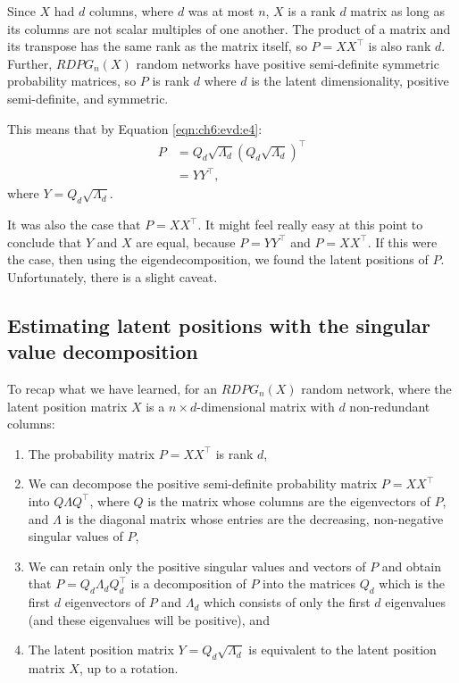 Since $X$ had $d$ columns, where $d$ was at most $n$, $X$ is a rank $d$ matrix as long as its columns are not scalar multiples of one another. The product of a matrix and its transpose has the same rank as the matrix itself, so $P = XX^\top$ is also rank $d$. Further, $RDPG_n(X)$ random networks have positive semi-definite symmetric probability matrices, so $P$ is rank $d$ where $d$ is the latent dimensionality, positive semi-definite, and symmetric. 

This means that by Equation \ref{eqn:ch6:evd:e4}:
\begin{align*}
    P &= Q_d \sqrt{\Lambda_d}\left(Q_d \sqrt{\Lambda_d}\right)^\top \\
    &= YY^\top,
\end{align*}
where $Y = Q_d \sqrt{\Lambda_d}$. 

It was also the case that $P = XX^\top$. It might feel really easy at this point to conclude that $Y$ and $X$ are equal, because $P = YY^\top$ and $P = XX^\top$. If this were the case, then using the eigendecomposition, we found the latent positions of $P$. Unfortunately, there is a slight caveat.


\subsection{Estimating latent positions with the singular value decomposition}

To recap what we have learned, for an $RDPG_n(X)$ random network, where the latent position matrix $X$ is a $n \times d$-dimensional matrix with $d$ non-redundant columns:
\begin{enumerate}
    \item The probability matrix $P = XX^\top$ is rank $d$,
    \item We can decompose the positive semi-definite probability matrix $P = XX^\top$ into $Q\Lambda Q^\top$, where $Q$ is the matrix whose columns are the eigenvectors of $P$, and $\Lambda$ is the diagonal matrix whose entries are the decreasing, non-negative singular values of $P$,
    \item We can retain {only} the positive singular values and vectors of $P$ and obtain that $P = Q_d \Lambda_d Q_d^\top$ is a decomposition of $P$ into the matrices $Q_d$ which is the first $d$ eigenvectors of $P$ and $\Lambda_d$ which consists of only the first $d$ eigenvalues (and these eigenvalues will be positive), and
    \item The latent position matrix $Y = Q_d \sqrt{\Lambda_d}$ is equivalent to the latent position matrix $X$, up to a rotation.
\end{enumerate}

